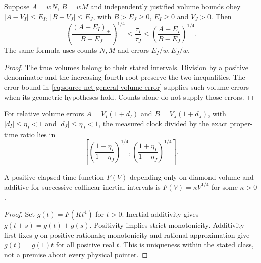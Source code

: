 \begin{proposition}
\label{prop:source-count-clock-error}
Suppose $A=wN$, $B=wM$ and independently justified volume bounds obey
$|A-V_I|\leq E_I$, $|B-V_J|\leq E_J$, with $B>E_J\geq0$,
$E_I\geq0$ and $V_J>0$. Then
\begin{equation}
 \left(\frac{(A-E_I)_+}{B+E_J}\right)^{1/4}
 \leq\frac{\tau_I}{\tau_J}\leq
 \left(\frac{A+E_I}{B-E_J}\right)^{1/4}.
 \label{eq:source-count-clock-error}
\end{equation}
The same formula uses counts $N,M$ and errors $E_I/w,E_J/w$.
\end{proposition}
\begin{proof}
The true volumes belong to their stated intervals. Division by a positive
denominator and the increasing fourth root preserve the two inequalities.
The error bound in \eqref{eq:source-net-general-volume-error} supplies
such volume errors when its geometric hypotheses hold. Counts alone do
not supply those errors.
\end{proof}

For relative volume errors $A=V_I(1+d_I)$ and $B=V_J(1+d_J)$, with
$|d_I|\leq\eta_I<1$ and $|d_J|\leq\eta_J<1$, the measured clock divided
by the exact proper-time ratio lies in
\begin{equation}
 \left[
 \left(\frac{1-\eta_I}{1+\eta_J}\right)^{1/4},
 \left(\frac{1+\eta_I}{1-\eta_J}\right)^{1/4}
 \right].
 \label{eq:source-count-clock-relative}
\end{equation}

\begin{proposition}
\label{prop:source-count-clock-uniqueness}
A positive elapsed-time function $F(V)$ depending only on diamond volume
and additive for successive collinear inertial intervals is
$F(V)=\kappa V^{1/4}$ for some $\kappa>0$.
\end{proposition}
\begin{proof}
Set $g(t)=F(Kt^4)$ for $t>0$. Inertial additivity gives
$g(t+s)=g(t)+g(s)$. Positivity implies strict monotonicity. Additivity
first fixes $g$ on positive rationals; monotonicity and rational
approximation give $g(t)=g(1)t$ for all positive real $t$.
This is uniqueness within the stated class, not a premise about every
physical pointer.
\end{proof}

